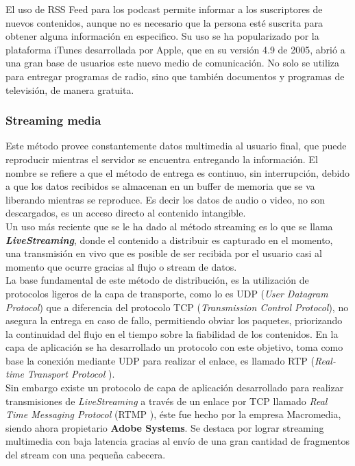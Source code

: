 El uso de RSS Feed para los podcast permite informar a los suscriptores de nuevos contenidos, aunque no es necesario que la persona esté suscrita para obtener alguna información en especifico. 
Su uso se ha popularizado por la plataforma iTunes desarrollada por Apple, que en su versión 4.9 de 2005, abrió a una gran base de usuarios este nuevo medio de comunicación. No solo se utiliza para entregar programas de radio, sino que también documentos y programas de televisión, de manera gratuita.\\

\subsubsection{Streaming media}
Este método provee constantemente datos multimedia al usuario final, que puede reproducir mientras el servidor se encuentra entregando la información.
El nombre se refiere a que el método de entrega es continuo, sin interrupción, debido a que los datos recibidos se almacenan en un buffer de memoria que se va liberando mientras se reproduce. Es decir los datos de audio o video, no son descargados,  es un acceso directo al contenido intangible.\\

Un uso más reciente que se le ha dado al método streaming es lo que se llama \textbf{\textit{LiveStreaming}}, donde el contenido a distribuir es capturado en el momento, una transmisión en vivo que es posible de ser recibida por el usuario casi al momento que ocurre gracias al flujo o stream de datos.\\

La base fundamental de este método de distribución, es la utilización de protocolos ligeros de la capa de transporte, como lo es UDP (\textit{User Datagram Protocol}) que a diferencia del protocolo TCP (\textit{Transmission Control Protocol}), no asegura la entrega en caso de fallo, permitiendo obviar los paquetes, priorizando la continuidad del flujo en el tiempo sobre la fiabilidad de los contenidos.  En la capa de aplicación se ha desarrollado un protocolo con este objetivo, toma como base la conexión mediante UDP para realizar el enlace, es llamado RTP (\textit{Real-time Transport Protocol} \cite{sota:rtp-draft}).\\

Sin embargo existe un protocolo de capa de aplicación desarrollado para realizar transmisiones de \textit{LiveStreaming} a través de un enlace por TCP llamado \textit{Real Time Messaging Protocol} (RTMP \cite{bib:rtmp-specs}), éste fue hecho por la empresa Macromedia, siendo ahora propietario \textbf{Adobe Systems}. Se destaca por lograr streaming multimedia con baja latencia gracias al envío de una gran cantidad de fragmentos del stream con una pequeña cabecera. \\

